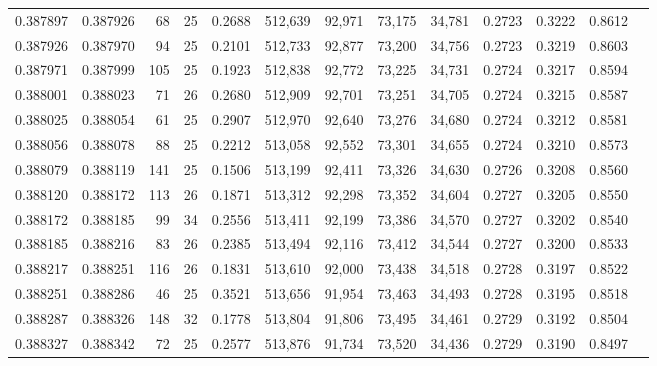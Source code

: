 \begin{tabular}{rrrrrrrrrrrrr}
0.387897 & 0.387926 &    68 &  25 &                                     0.2688 & 512,639 &  92,971 &  73,175 &  34,781 & 0.2723 & 0.3222 & 0.8612 \\
0.387926 & 0.387970 &    94 &  25 &                                     0.2101 & 512,733 &  92,877 &  73,200 &  34,756 & 0.2723 & 0.3219 & 0.8603 \\
0.387971 & 0.387999 &   105 &  25 &                                     0.1923 & 512,838 &  92,772 &  73,225 &  34,731 & 0.2724 & 0.3217 & 0.8594 \\
0.388001 & 0.388023 &    71 &  26 &                                     0.2680 & 512,909 &  92,701 &  73,251 &  34,705 & 0.2724 & 0.3215 & 0.8587 \\
0.388025 & 0.388054 &    61 &  25 &                                     0.2907 & 512,970 &  92,640 &  73,276 &  34,680 & 0.2724 & 0.3212 & 0.8581 \\
0.388056 & 0.388078 &    88 &  25 &                                     0.2212 & 513,058 &  92,552 &  73,301 &  34,655 & 0.2724 & 0.3210 & 0.8573 \\
0.388079 & 0.388119 &   141 &  25 &                                     0.1506 & 513,199 &  92,411 &  73,326 &  34,630 & 0.2726 & 0.3208 & 0.8560 \\
0.388120 & 0.388172 &   113 &  26 &                                     0.1871 & 513,312 &  92,298 &  73,352 &  34,604 & 0.2727 & 0.3205 & 0.8550 \\
0.388172 & 0.388185 &    99 &  34 &                                     0.2556 & 513,411 &  92,199 &  73,386 &  34,570 & 0.2727 & 0.3202 & 0.8540 \\
0.388185 & 0.388216 &    83 &  26 &                                     0.2385 & 513,494 &  92,116 &  73,412 &  34,544 & 0.2727 & 0.3200 & 0.8533 \\
0.388217 & 0.388251 &   116 &  26 &                                     0.1831 & 513,610 &  92,000 &  73,438 &  34,518 & 0.2728 & 0.3197 & 0.8522 \\
0.388251 & 0.388286 &    46 &  25 &                                     0.3521 & 513,656 &  91,954 &  73,463 &  34,493 & 0.2728 & 0.3195 & 0.8518 \\
0.388287 & 0.388326 &   148 &  32 &                                     0.1778 & 513,804 &  91,806 &  73,495 &  34,461 & 0.2729 & 0.3192 & 0.8504 \\
0.388327 & 0.388342 &    72 &  25 &                                     0.2577 & 513,876 &  91,734 &  73,520 &  34,436 & 0.2729 & 0.3190 & 0.8497 \\

\end{tabular}

